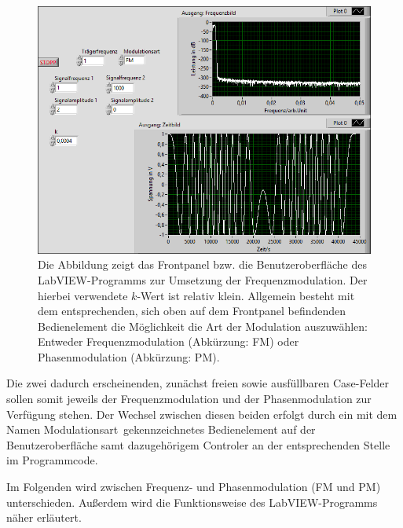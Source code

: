\documentclass[
a4paper,
12pt,
pagesize,
ngerman
]{scrartcl}
\begin{document}
	\begin{figure}[H]
		\centering
		\includegraphics[width=1.0\textwidth]{EIRE2018Dateien/Tag4/FMPM-Erzeugung/FM-FMPM-Erzeugungp}
		\caption{Die Abbildung zeigt das Frontpanel bzw. die Benutzeroberfläche des LabVIEW-Programms zur Umsetzung der Frequenzmodulation. Der hierbei verwendete $k$-Wert ist relativ klein. %
		Allgemein besteht mit dem entsprechenden, sich oben auf dem Frontpanel befindenden Bedienelement die Möglichkeit die Art der Modulation auszuwählen: Entweder Frequenzmodulation (Abkürzung: FM) oder Phasenmodulation (Abkürzung: PM).}
		\label{FMAusgabekleinesk}
	\end{figure}
	
	\noindent Die zwei dadurch erscheinenden, zunächst freien sowie ausfüllbaren Case-Felder sollen somit jeweils der Frequenzmodulation und der Phasenmodulation zur Verfügung stehen. %
	Der Wechsel zwischen diesen beiden erfolgt durch ein mit dem Namen \glqq Modulationsart\grqq\ gekennzeichnetes Bedienelement auf der Benutzeroberfläche samt dazugehörigem Controler an der entsprechenden Stelle im Programmcode. %
	
	Im Folgenden wird zwischen Frequenz- und Phasenmodulation (FM und PM) unterschieden. 
	Außerdem wird die Funktionsweise des LabVIEW-Programms näher erläutert.
	
\end{document}
